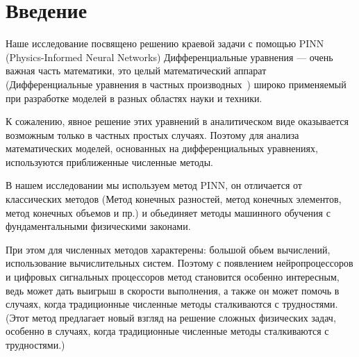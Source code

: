 \section*{Введение}
Наше исследование посвящено решению краевой задачи с помощью PINN (Physics-Informed Neural Networks)
Дифференциальные уравнения --- очень важная часть математики, это целый математический аппарат (Дифференциальные уравнения в частных производных ) широко применяемый при разработке моделей в  разных областях науки и техники.

К сожалению, явное решение этих уравнений в аналитическом виде оказывается возможным только в частных простых случаях.
Поэтому для анализа математических моделей, основанных на дифференциальных уравнениях, используются  приближенные численные методы.
\par В нашем исследовании мы используем метод PINN, он отличается от классических методов (Метод конечных разностей, метод конечных элементов, метод конечных объемов и пр.)
и обьединяет методы машинного обучения с фундаментальными физическими законами.

\medskip
\medskip

При этом для численных методов характерены: большой обьем вычислений, использование вычислительных систем. Поэтому с появлением нейропроцессоров и цифровых сигнальных процессоров метод становится особенно интересным, ведь может дать выигрыш в скорости выполнения, а также он может помочь в случаях, когда традиционные численные методы сталкиваются с трудностями. (Этот метод предлагает новый взгляд на решение сложных физических задач, особенно в случаях, когда традиционные численные методы сталкиваются с трудностями.)